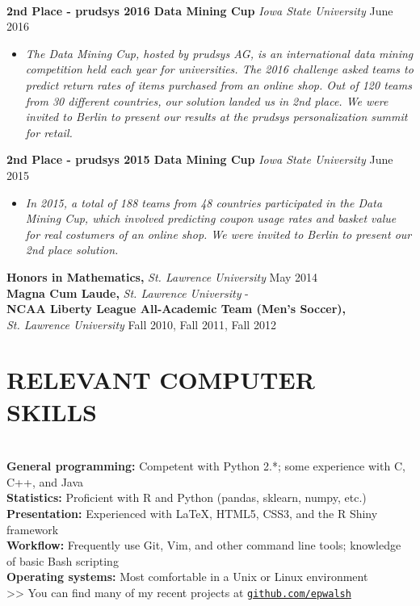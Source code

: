 \documentclass{res} %
\begin{document}
\begin{resume}
\hrulefill \\
{\bf 2nd Place - prudsys 2016 Data Mining Cup} {\sl Iowa State University} \dotfill June 2016
\begin{itemize}[label=>>]
  \item \emph{
      The Data Mining Cup, hosted by prudsys AG, is an international data mining 
      competition held each year for universities. The 2016 challenge asked teams to 
      predict return rates of items purchased from an online shop. Out of 120 teams from 30 
      different countries, our solution landed us in 2nd place. We were invited to Berlin to 
      present our results at the prudsys personalization summit for retail.
    }
\end{itemize}
{\bf 2nd Place - prudsys 2015 Data Mining Cup} {\sl Iowa State University} \dotfill June 2015 
\begin{itemize}[label=>>]
  \item \emph{
      In 2015, a total of 188 teams from 48 countries participated in the Data Mining Cup, which involved predicting coupon usage rates and basket value
      for real costumers of an online shop. We were invited to Berlin to present our 2nd place solution.
    }
\end{itemize}
\vspace{-1em}
{\bf Honors in Mathematics,} {\sl St. Lawrence University} \dotfill May 2014 \\
{\bf Magna Cum Laude,} {\sl St. Lawrence University} \hfill - \\
{\bf NCAA Liberty League All-Academic Team (Men's Soccer),} \\
{\sl St. Lawrence University} \dotfill Fall 2010, Fall 2011, Fall 2012 


\section{RELEVANT COMPUTER SKILLS}

\hrulefill \\
{\bf General programming:} Competent with Python 2.*; some experience with C, C++, and Java \\
{\bf Statistics:} Proficient with R and Python (pandas, sklearn, numpy, etc.) \\
{\bf Presentation:} Experienced with \LaTeX, HTML5, CSS3, and the R Shiny framework \\
{\bf Workflow:} Frequently use Git, Vim, and other command line tools; knowledge of basic Bash scripting \\
{\bf Operating systems:} Most comfortable in a Unix or Linux environment \\
>> You can find many of my recent projects at \href{http://github.com/epwalsh}{\texttt{github.com/epwalsh}}


\end{resume}
\end{document}

